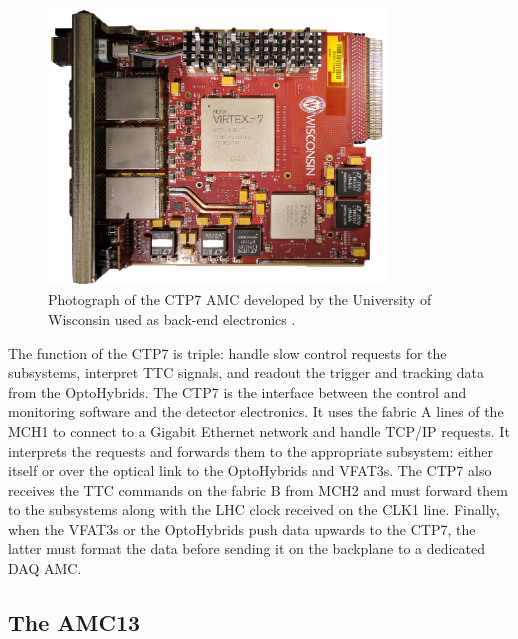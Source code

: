       \begin{figure}[h!]
        \centering
        \includegraphics[width=0.8\textwidth]{img/II-2-daq/ctp7.png}
        \caption{Photograph of the CTP7 AMC developed by the University of Wisconsin used as back-end electronics \cite{CTP7}.}
        \label{fig:II-2-ctp7}
      \end{figure}

      The function of the CTP7 is triple: handle slow control requests for the subsystems, interpret TTC signals, and readout the trigger and tracking data from the OptoHybrids. The CTP7 is the interface between the control and monitoring software and the detector electronics. It uses the fabric A lines of the MCH1 to connect to a Gigabit Ethernet network and handle TCP/IP requests. It interprets the requests and forwards them to the appropriate subsystem: either itself or over the optical link to the OptoHybrids and VFAT3s. The CTP7 also receives the TTC commands on the fabric B from MCH2 and must forward them to the subsystems along with the LHC clock received on the CLK1 line. Finally, when the VFAT3s or the OptoHybrids push data upwards to the CTP7, the latter must format the data before sending it on the backplane to a dedicated DAQ AMC.

    \subsection{The AMC13}

